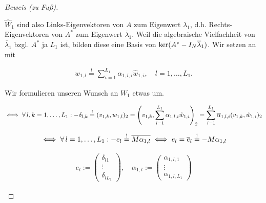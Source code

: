 \begin{proof}[Beweis (zu Fuß)]
\begin{enumerate}[label = (\roman*)]
        $\hat W_1$ sind also Links-Eigenvektoren von $A$ zum Eigenwert $\lambda_1$, d.h. Rechts-Eigenvektoren von $A^\ast$ zum Eigenwert $\overline \lambda_1$.
        Weil die algebraische Vielfachheit von $\overline \lambda_1$ bzgl. $A^\ast$ ja $L_1$ ist, bilden diese eine Basis von $\operatorname{ker}(A^\ast - I_N \overline \lambda_1)$.
        Wir setzen an mit

        \begin{align*}
            w_{1, l}
            \stackrel{!}{=}
            \sum_{i=1}^{L_1}
                \alpha_{1, l, i} \hat w_{1, i},
            \quad
            l = 1, \dots, L_1.
        \end{align*}

        Wir formulieren unseren Wunsch an $W_1$ etwas um.

        \begin{align*}
            \iff
            \forall \, l, k = 1, \dots, L_1:
                -\delta_{l, k}
                \stackrel{!}{=}
                (v_{1, k}, w_{1, l})_2
                =
                {\left ( 
                    v_{1, k},
                    \sum_{i=1}^{L_1}
                        \alpha_{1, l, i} \hat w_{1, i}
                 \right )}_2
                =
                \sum_{i=1}^{L_1}
                    \overline \alpha_{1, l, i} (v_{1, k}, \hat w_{1, i})_2
        \end{align*}

        \begin{align*}
            \iff
            \forall \, l = 1, \dots, L_1:
                -e_l
                \stackrel{!}{=}
                \overline{M \alpha_{1, l}}
            \iff
                e_l
                =
                \overline e_l
                \stackrel{!}{=}
                -M \alpha_{1, l}
        \end{align*}

        \begin{align*}
            e_l
            :=
            \begin{pmatrix}
                \delta_{l 1} \\ \vdots \\ \delta_{l L_1}
            \end{pmatrix},
            \quad
            \alpha_{1, l}
            :=
            \begin{pmatrix}
                \alpha_{1, l, 1} \\ \vdots \\ \alpha_{1, l, L_1}
            \end{pmatrix}
        \end{align*}


\end{enumerate}
\end{proof}
